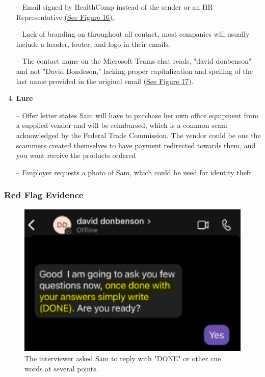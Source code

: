\begin{fullwidth}
\begin{enumerate}
            \\\medskip
                \item[--] Email signed by HealthComp instead of the sender or an HR Representative \hyperref[sec:Fig16]{(See Figure 16)}.
                \item[--] Lack of branding on throughout all contact, most companies will usually include a header, footer, and logo in their emails. 
            \\\medskip            
                \item[--] The contact name on the Microsoft Teams chat reads, "david donbenson" and not "David Bondeson," lacking proper capitalization and spelling of the last name provided in the original email \hyperref[sec:Fig17]{(See Figure 17}). 
    \item   \textbf{Lure}
            \\\medskip
                \item[--] Offer letter states Sam will have to purchase her own office equipment from a supplied vendor and will be reimbursed, which is a common scam acknowledged by the Federal Trade Commission. The vendor could be one the scammers created themselves to have payment redirected towards them, and you wont receive the products ordered 
                \item[--] Employer requests a photo of Sam, which could be used for identity theft 
\end{enumerate}

\subsubsection{Red Flag Evidence}
    \begin{figure}[H] %
        \label{sec:Fig7}
        \centering
        \includegraphics[width=.75\linewidth]{assets/chatbot.png}
        \captionsetup{justification=centering}
        \caption{The interviewer asked Sam to reply with "DONE" or other cue words at several points.}
    \end{figure}


\end{fullwidth}
